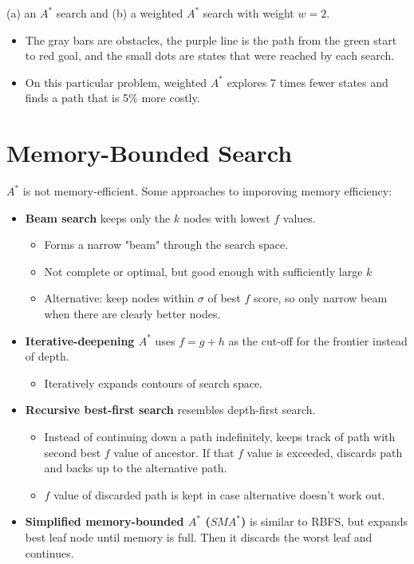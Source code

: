 \documentclass[11pt]{article}
\begin{document}
(a) an \(A^*\) search and (b) a weighted \(A^*\) search with weight \(w = 2\).

\begin{itemize}
\item The gray bars are obstacles, the purple line is the path from the green start to red goal, and the small dots are states that were reached by each search.
\item On this particular problem, weighted \(A^*\) explores 7 times fewer states and finds a path that is 5\% more costly.
\end{itemize}
\section{Memory-Bounded Search}
\label{sec:org80aa413}

\(A^*\) is not memory-efficient.  Some approaches to imporoving memory efficiency:

\begin{itemize}
\item \textbf{Beam search}  keeps only the \(k\) nodes with lowest \(f\) values.

\begin{itemize}
\item Forms a narrow "beam" through the search space.
\item Not complete or optimal, but good enough with sufficiently large \(k\)
\item Alternative: keep nodes within \(\sigma\) of best \(f\) score, so only narrow beam when there are clearly better nodes.
\end{itemize}

\item \textbf{Iterative-deepening \(A^*\)} uses \(f = g + h\) as the cut-off for the frontier instead of depth.

\begin{itemize}
\item Iteratively expands contours of search space.
\end{itemize}

\item \textbf{Recursive best-first search} resembles depth-first search.

\begin{itemize}
\item Instead of continuing down a path indefinitely, keeps track of path with second best \(f\) value of ancestor.  If that \(f\) value is exceeded, discards path and backs up to the alternative path.
\item \(f\) value of discarded path is kept in case alternative doesn't work out.
\end{itemize}

\item \textbf{Simplified memory-bounded \(A^*\) (\(SMA^*\))} is similar to RBFS, but expands best leaf node until memory is full.  Then it discards the worst leaf and continues.
\end{itemize}
\end{document}
